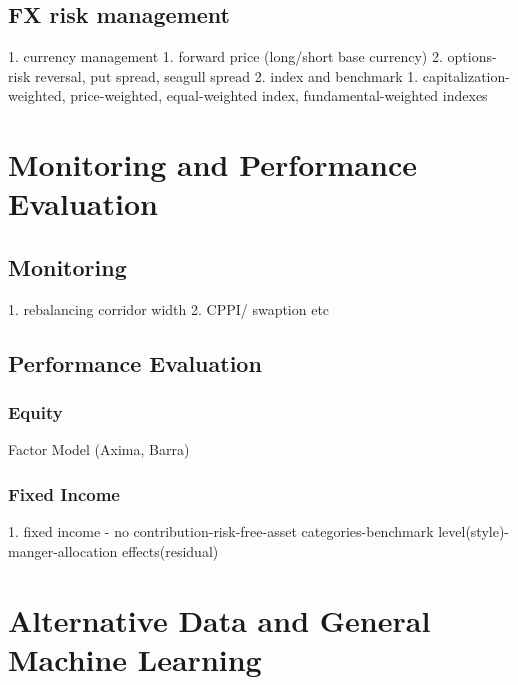 \documentclass[11pt, openany]{book}              %
\begin{document}
\section{FX risk management}
    1. currency management 
        1. forward price (long/short base currency) 
        2. options- risk reversal, put spread, seagull spread
    2. index and benchmark
        1. capitalization-weighted, price-weighted, equal-weighted index, fundamental-weighted indexes 



\chapter{Monitoring and Performance Evaluation}

\section{Monitoring}
    1. rebalancing corridor width
    2. CPPI/ swaption etc

\section{Performance Evaluation}

\subsection{Equity}

Factor Model (Axima, Barra) 
\subsection{Fixed Income}

    1. fixed income - no contribution-risk-free-asset categories-benchmark level(style)-manger-allocation effects(residual) 


\chapter{Alternative Data and General Machine Learning}
 
\end{document}
